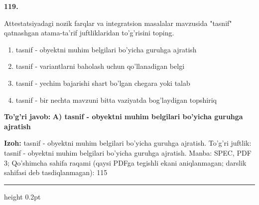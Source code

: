 \documentclass[10pt,a4paper]{article}
\begin{document}
{\bfseries\sffamily\color{ink} 119.}
\par
Attestatsiyadagi nozik farqlar va integratsion masalalar mavzusida "tasnif" qatnashgan atama-ta'rif juftliklaridan to'g'risini toping.
\begin{enumerate}[label=\Alph*),leftmargin=9mm]
\item tasnif - obyektni muhim belgilari bo'yicha guruhga ajratish
\item tasnif - variantlarni baholash uchun qo'llanadigan belgi
\item tasnif - yechim bajarishi shart bo'lgan chegara yoki talab
\item tasnif - bir nechta mavzuni bitta vaziyatda bog'laydigan topshiriq
\end{enumerate}
\begin{tcolorbox}[enhanced,breakable,colback=teal!4,colframe=teal!60!black,boxrule=0.45pt,arc=1.2mm,left=2.7mm,right=2.7mm,top=1.8mm,bottom=1.8mm,before skip=2mm,after skip=2mm]
{\bfseries\sffamily\color{teal}To'g'ri javob:} \textbf{A) tasnif - obyektni muhim belgilari bo'yicha guruhga ajratish}
\par\smallskip
{\bfseries Izoh:} tasnif - obyektni muhim belgilari bo'yicha guruhga ajratish. To'g'ri juftlik: tasnif - obyektni muhim belgilari bo'yicha guruhga ajratish. Manba: SPEC, PDF 3; Qo'shimcha sahifa raqami (qaysi PDFga tegishli ekani aniqlanmagan; darslik sahifasi deb tasdiqlanmagan): 115
\end{tcolorbox}
\vspace{2mm}\hrule height 0.2pt\vspace{3mm}
\end{document}
